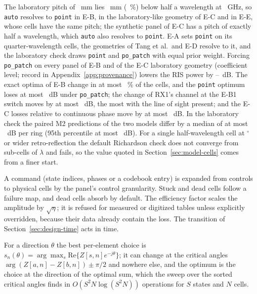 The laboratory pitch of \numLabPitchMm~mm lies \numLabPitchMarginMm~mm
(\numLabPitchMarginPct~\%) below half a wavelength at \numLabFreqGHz~GHz, so \texttt{auto}
resolves to \texttt{point} in E-B, in the laboratory-like geometry of E-C and in E-E, whose
cells have the same pitch; the synthetic panel of E-C has a pitch of exactly half a
wavelength, which \texttt{auto} also resolves to \texttt{point}. E-A sets \texttt{point} on its
quarter-wavelength cells, the geometries of Tang et al.\ and E-D resolve to it, and the
laboratory check draws \texttt{point} and \texttt{po\_patch} with equal prior weight. Forcing \texttt{po\_patch} on every panel of E-B and of the E-C laboratory
geometry (coefficient level; record in Appendix~\ref{app:provenance}) lowers the RIS power by
\numCellSensRisMinDb--\numCellSensRisMaxDb~dB. The exact optima of E-B change in at most
\numCellSensCfgPct~\% of the cells, and the \texttt{point} optimum loses at most
\numCellSensDeployLossDb~dB under \texttt{po\_patch}; the change of RX1's channel at the E-B1
switch moves by at most \numCellSensSwitchMaxDb~dB, the most with the line of sight present;
and the E-C losses relative to continuous phase move by at most \numCellSensEcMaxDb~dB. In the
laboratory check the paired M2 predictions of the two models differ by a median of at most
\numLabCmMedianMaxDb~dB per ring (95th percentile at most \numLabCmQninetyfiveMaxDb~dB). For a
single half-wavelength cell at \numCellRetroAngleB$^\circ$ or wider retro-reflection the
default Richardson check does not converge from sub-cells of \numSubcellMax$\lambda$ and fails,
so the value quoted in Section~\ref{sec:model-cells} comes from a finer start.

A command (state indices, phases or a codebook entry) is expanded from
controls to physical cells by the panel's control granularity. Stuck and dead cells follow a
failure map, and dead cells absorb by default. The efficiency factor scales the amplitude by
$\sqrt{\eta}$; it is refused for measured or digitized tables unless explicitly overridden,
because their data already contain the loss. The transition of
Section~\ref{sec:design-time} acts in time.

For a direction $\theta$ the best per-element choice is
$s_n(\theta)=\arg\max_s\mathrm{Re}\{Z[s,n]e^{-j\theta}\}$; it can change at the critical
angles $\arg(Z[a,n]-Z[b,n])\pm\pi/2$ and nowhere else, and the optimum is the choice at the
direction of the optimal sum, which the sweep over the sorted critical angles finds in
$O(S^2N\log(S^2N))$ operations for $S$ states and $N$ cells.

